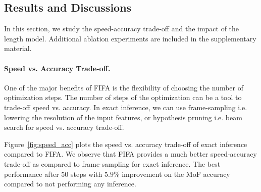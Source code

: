 \subsection{Results and Discussions}
In this section, we study the speed-accuracy trade-off and the impact of the length model. 
Additional ablation experiments are included in the supplementary material.
\paragraph{Speed vs. Accuracy Trade-off.}
One of the major benefits of FIFA is the flexibility of choosing the number of optimization steps. The number of steps of the optimization can be a tool to trade-off speed vs. accuracy.
In exact inference, we can use frame-sampling i.e. lowering the resolution of the input features, or hypothesis pruning i.e. beam search for speed vs. accuracy trade-off.

Figure~\ref{fig:speed_acc} plots the speed vs. accuracy trade-off of exact inference compared to FIFA.
We observe that FIFA provides a much better speed-accuracy trade-off as compared to frame-sampling for exact inference. The best performance after 50 steps with $5.9\%$ improvement on the MoF accuracy compared to not performing any inference.



\begin{comment}
   
\begin{table}[tb]
   \centering
   \resizebox{0.75\columnwidth}{!}{\begin{tabular}{cccccc }
         \toprule
         Num. Steps & MoF & MoF-BG & IoU & IoD & Time (min) \\
         \midrule
         No inference & 45.4 & 44.7 & 37.3 & 51.2 & 1.0\\
         \midrule
         2 steps  & 47.9 & 47.1 & 39.8 & 53.0 & 1.2 \\
         5 steps  & 49.1 & 48.3 & 40.0 & 52.8 & 1.5 \\
         10 steps & 50.1 & 49.4 & 40.2 & 52.9 & 2.0\\
         30 steps & 51.2 & 50.6 & 41.0 & 53.2 & 4.2\\
         50 steps & \textbf{51.3} & \textbf{50.7} & \textbf{41.1} & \textbf{53.3} & 6.5 \\
         60 steps & \textbf{51.3} & \textbf{50.7} & \textbf{41.1} & \textbf{53.3} & 7.7 \\
         \midrule
         Exact Inference & 50.7 & 50.3 & 40.9 & 54.0 & 32.85 \\
         \bottomrule
      \end{tabular}
    }
   \caption{Impact of the number of optimization steps for FIFA+MuCon for weakly supervised action segmentation on the Breakfast dataset.
}
   \label{tab:optimization_steps}
\end{table}

\end{comment}


